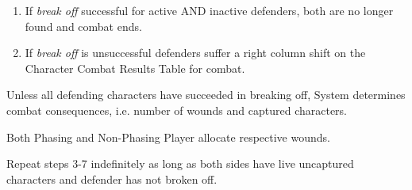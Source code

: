 \documentclass[12pt,letterpaper]{scrreprt}
\begin{document}
\begin{usecase}
{\begin{enumerate}
\begin{enumerate}
					\item If \textit{break off} successful for active AND inactive defenders, both are no longer found and combat ends.
					\item If \textit{break off} is unsuccessful defenders suffer a right column shift on the Character Combat Results Table for combat.
					\end{enumerate}
				\end{enumerate}
			\item Unless all defending characters have succeeded in breaking off, System determines combat consequences, i.e. number of wounds and captured characters.
			\item Both Phasing and Non-Phasing Player allocate respective wounds.
			\item Repeat steps 3-7 indefinitely as long as both sides have live uncaptured characters and defender has not broken off.
		}
		\end{usecase}
		
\end{document}
